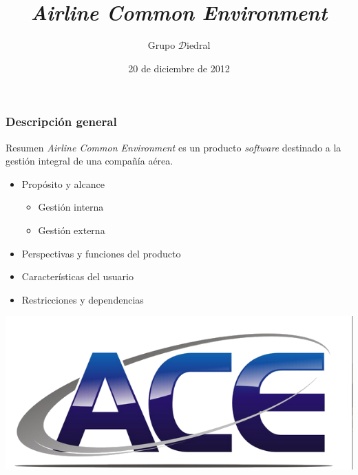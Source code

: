 \documentclass{beamer}
\title{\itshape Airline Common Environment}
\author{Grupo $\mathcal{D}$iedral}
\date{20 de diciembre de 2012}
\newcommand{\software}{\textit{software }}
\begin{document}
\maketitle

\begin{frame}
	\frametitle{Descripción general}

	\begin{block}{Resumen}
		\textit{Airline Common Environment} es un producto \software destinado a la gestión integral de una compañía aérea.	\pause
	\end{block}

	\begin{itemize}
		\item Propósito y alcance
			\begin{itemize}
				\item Gestión interna
				\item Gestión externa
			\end{itemize} \pause
		\item Perspectivas y funciones del producto \pause
		\item Características del usuario \pause
		\item Restricciones y dependencias
	\end{itemize}

	\includegraphics[width=\paperwidth]{logoace.png}
\end{frame}
\end{document}
